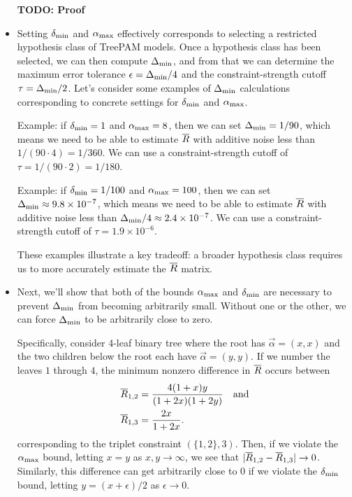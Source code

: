 \documentclass{article}
\theoremstyle{definition}
\begin{document}
\begin{itemize}
\par
{\bf TODO: Proof}
%
\item Setting $\delta_{\text{min}}$ and $\alpha_{\text{max}}$ effectively corresponds to selecting a restricted hypothesis class of TreePAM models.
Once a hypothesis class has been selected, we can then compute $\Delta_{\text{min}}$, and from that we can determine the maximum error tolerance $\epsilon = \Delta_{\text{min}}/4$ and the constraint-strength cutoff $\tau = \Delta_{\text{min}}/2$.
Let's consider some examples of $\Delta_{\text{min}}$ calculations corresponding to concrete settings for $\delta_{\text{min}}$ and $\alpha_{\text{max}}$.
\par
Example: if $\delta_{\text{min}} = 1$ and $\alpha_{\text{max}} = 8$, then we can set $\Delta_{\text{min}} = 1/90$, which means we need to be able to estimate $\overline{R}$ with additive noise less than $1/(90 \cdot 4) = 1/360$.
We can use a constraint-strength cutoff of $\tau = 1/(90 \cdot 2) = 1/180$.
\par
Example: if $\delta_{\text{min}} = 1/100$ and $\alpha_{\text{max}} = 100$, then we can set $\Delta_{\text{min}} \approx 9.8 \times 10^{-7}$, which means we need to be able to estimate $\overline{R}$ with additive noise less than $\Delta_{\text{min}}/4 \approx 2.4 \times 10^{-7}$.
We can use a constraint-strength cutoff of $\tau = 1.9 \times 10^{-6}$.
\par
These examples illustrate a key tradeoff: a broader hypothesis class requires us to more accurately estimate the $\overline{R}$ matrix.
%
\item Next, we'll show that both of the bounds $\alpha_{\text{max}}$ and $\delta_{\text{min}}$ are necessary to prevent $\Delta_{\text{min}}$ from becoming arbitrarily small.
Without one or the other, we can force $\Delta_{\text{min}}$ to be arbitrarily close to zero.
\par
Specifically, consider 4-leaf binary tree where the root has $\vec\alpha = (x,x)$ and the two children below the root each have $\vec\alpha = (y,y)$.
If we number the leaves $1$ through $4$, the minimum nonzero difference in $\overline{R}$ occurs between
\begin{align*}
\overline{R}_{1,2} &= \frac{4(1+x)y}{(1+2x)(1+2y)} \quad \text{and} \\
\overline{R}_{1,3} &= \frac{2x}{1+2x}.
\end{align*}
corresponding to the triplet constraint $(\{1,2\},3)$.
Then, if we violate the $\alpha_{\text{max}}$ bound, letting $x = y$ as $x,y \to \infty$, we see that $|\overline{R}_{1,2} - \overline{R}_{1,3}| \to 0$.
Similarly, this difference can get arbitrarily close to $0$ if we violate the $\delta_{\text{min}}$ bound, letting $y = (x+\epsilon) / 2$ as $\epsilon \to 0$.
\end{itemize}
\end{document}
